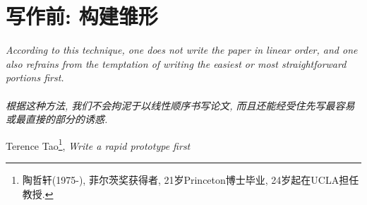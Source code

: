 \documentclass{booki}
\begin{document}
\section{写作前: 构建雏形}
\noindent \textit{According to this technique, one does not write the paper in linear order, and one also refrains from the temptation of writing the easiest or most straightforward portions first. \\ \ \\ 根据这种方法, 我们不会拘泥于以线性顺序书写论文, 而且还能经受住先写最容易或最直接的部分的诱惑. }
\begin{flushright}
    \cndash Terence Tao\footnote{陶哲轩(1975-), 菲尔茨奖获得者, 21岁Princeton博士毕业, 24岁起在UCLA担任教授.}, \textit{Write a rapid prototype first\cite{TaoWrite2007}}
\end{flushright}
\setlength{\parskip}{1.5em}
\end{document}
